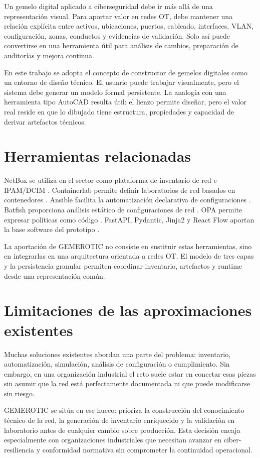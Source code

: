 Un gemelo digital aplicado a ciberseguridad debe ir más allá de una representación visual. Para aportar valor en redes OT, debe mantener una relación explícita entre activos, ubicaciones, puertos, cableado, interfaces, VLAN, configuración, zonas, conductos y evidencias de validación. Solo así puede convertirse en una herramienta útil para análisis de cambios, preparación de auditorías y mejora continua.

En este trabajo se adopta el concepto de constructor de gemelos digitales como un entorno de diseño técnico. El usuario puede trabajar visualmente, pero el sistema debe generar un modelo formal persistente. La analogía con una herramienta tipo AutoCAD resulta útil: el lienzo permite diseñar, pero el valor real reside en que lo dibujado tiene estructura, propiedades y capacidad de derivar artefactos técnicos.

\section{Herramientas relacionadas} \label{sec:herramientas-relacionadas}

NetBox se utiliza en el sector como plataforma de inventario de red e IPAM/DCIM \cite{netboxdocs}. Containerlab permite definir laboratorios de red basados en contenedores \cite{containerlabdocs}. Ansible facilita la automatización declarativa de configuraciones \cite{ansibledocs}. Batfish proporciona análisis estático de configuraciones de red \cite{batfish}. OPA permite expresar políticas como código \cite{opadocs}. FastAPI, Pydantic, Jinja2 y React Flow aportan la base software del prototipo \cite{fastapidocs,pydanticdocs,jinjadocs,reactflowdocs}.

La aportación de GEMEROTIC no consiste en sustituir estas herramientas, sino en integrarlas en una arquitectura orientada a redes OT. El modelo de tres capas y la persistencia granular permiten coordinar inventario, artefactos y runtime desde una representación común.

\section{Limitaciones de las aproximaciones existentes} \label{sec:limitaciones-existentes}

Muchas soluciones existentes abordan una parte del problema: inventario, automatización, simulación, análisis de configuración o cumplimiento. Sin embargo, en una organización industrial el reto suele estar en conectar esas piezas sin asumir que la red está perfectamente documentada ni que puede modificarse sin riesgo.

GEMEROTIC se sitúa en ese hueco: prioriza la construcción del conocimiento técnico de la red, la generación de inventario enriquecido y la validación en laboratorio antes de cualquier cambio sobre producción. Esta decisión encaja especialmente con organizaciones industriales que necesitan avanzar en ciber-resiliencia y conformidad normativa sin comprometer la continuidad operacional.
